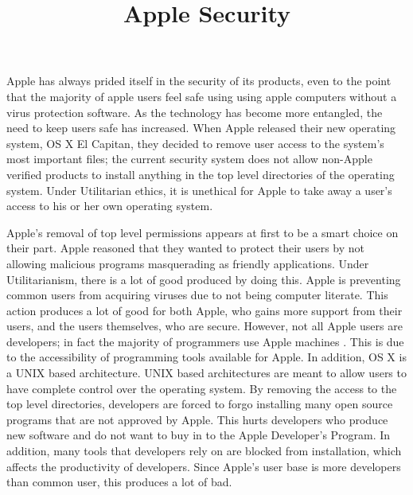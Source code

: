 \documentclass{paper}
\title{Apple Security}
\begin{document}
\drafth{}
\inlinetitle

\begin{linenumbers}

Apple has always prided itself in the security of its products, even to the point that the majority of apple users feel safe using using apple computers without a virus protection software. As the technology has become more entangled, the need to keep users safe has increased. When Apple released their new operating system, OS X El Capitan, they decided to remove user access to the system's most important files; the current security system does not allow non-Apple verified products to install anything in the top level directories of the operating system. Under Utilitarian ethics, it is unethical for Apple to take away a user's access to his or her own operating system.

Apple's removal of top level permissions appears at first to be a smart choice on their part. Apple reasoned that they wanted to protect their users by not allowing malicious programs masquerading as friendly applications. Under Utilitarianism, there is a lot of good produced by doing this. Apple is preventing common users from acquiring viruses due to not being computer literate. This action produces a lot of good for both Apple, who gains more support from their users, and the users themselves, who are secure. However, not all Apple users are developers; in fact the majority of programmers use Apple machines \cite{wiki}. This is due to the accessibility of programming tools available for Apple. In addition, OS X is a UNIX based architecture. UNIX based architectures are meant to allow users to have complete control over the operating system. By removing the access to the top level directories, developers are forced to forgo installing many  open source programs that are not approved by Apple. This hurts developers who produce new software and do not want to buy in to the Apple Developer's Program. In addition, many tools that developers rely on are blocked from installation, which affects the productivity of developers. Since Apple's user base is more developers than common user, this produces a lot of bad.


\end{linenumbers}
\end{document}

